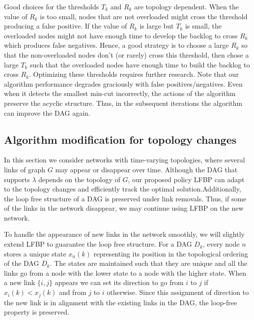\documentclass{sig-alternate-2013}
\begin{document}
Good choices for the thresholds $T_k$ and $R_k$ are topology dependent. When the value of $R_k$ is too small, nodes that are not overloaded might cross the threshold producing a false positive. If the value of $R_k$ is large but $T_k$ is small, the overloaded nodes might not have enough time to develop the backlog to cross $R_k$ which produces false negatives. Hence, a good strategy is to choose a large $R_k$ so that the non-overloaded nodes don't (or rarely) cross this threshold, then chose a large $T_k$ such that the overloaded nodes have enough time to build the backlog to cross $R_k$. Optimizing these thresholds requires further research. Note that our algorithm performance degrades graciously with false positives/negatives. Even when it detects the smallest min-cut incorrectly, the actions of the algorithm preserve the acyclic structure. Thus, in the subsequent iterations the algorithm can improve the DAG again. 




\subsection{Algorithm modification for topology changes}
In this section we consider networks with time-varying topologies, where several links of graph $G$ may appear or disappear over time. Although the DAG that supports $\lambda$ depends on the topology of $G$, our proposed policy LFBP can adapt to the topology changes and efficiently track the optimal solution.Additionally, the loop free structure of a DAG is preserved under link removals. Thus, if some of the links in the network disappear, we may continue using LFBP on the new network. 

To handle the appearance of new links in the network smoothly, we will slightly extend LFBP to guarantee the  loop free structure.
 For a DAG $D_k$, every node $n$ stores a unique state $x_n(k)$ representing its position in the topological ordering of the DAG $D_k$. The states are maintained such that they are unique and all the links go from a node with the lower state to a node with the higher state. When a new link $\{i,j\}$ appears we can set its direction to go from $i$ to $j$ if $x_i(k) < x_j(k)$ and from $j$ to $i$ otherwise. Since this assignment of direction to the new link is in alignment with the existing links in the DAG, the loop-free property is preserved.
\end{document}
